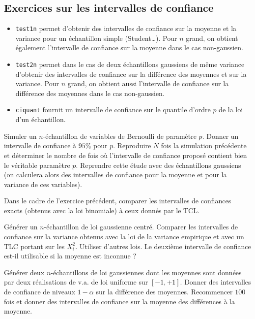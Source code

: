 \subsection{Exercices sur les intervalles de confiance}

\begin{itemize}
\item \texttt{test1n} permet d'obtenir des intervalles de confiance sur la
  moyenne et la variance pour un échantillon simple (Student\ldots). Pour $n$
  grand, on obtient également l'intervalle de confiance sur la moyenne dans le
  cas non-gaussien.
\item \texttt{test2n} permet dans le cas de deux échantillons gaussiens de
  même variance d'obtenir des intervalles de confiance sur la différence des
  moyennes et sur la variance. Pour $n$ grand, on obtient aussi l'intervalle
  de confiance sur la différence des moyennes dans le cas non-gaussien.
\item \texttt{ciquant} fournit un intervalle de confiance sur le quantile
  d'ordre $p$ de la loi d'un échantillon.
\end{itemize}

\begin{exo}
  Simuler un $n$-échantillon de variables de Bernoulli de paramètre $p$.
  Donner un intervalle de confiance à $95\%$ pour $p$. Reproduire $N$ fois la
  simulation précédente et déterminer le nombre de fois où l'intervalle de
  confiance proposé contient bien le véritable paramètre $p$. Reprendre cette
  étude avec des échantillons gaussiens (on calculera alors des intervalles de
  confiance pour la moyenne et pour la variance de ces variables).
\end{exo}

\begin{exo}
  Dans le cadre de l'exercice précédent, comparer les intervalles de
  confiances exacts (obtenus avec la loi binomiale) à ceux donnés par le TCL.
\end{exo}

\begin{exo}
  Générer un $n$-échantillon de loi gaussienne centré. Comparer les
  intervalles de confiance sur la variance obtenus avec la loi de la variance
  empirique et avec un TLC portant sur les $X_i^2$. Utiliser d'autres lois. Le
  deuxième intervalle de confiance est-il utilisable si la moyenne est
  inconnue ?
\end{exo}

\begin{exo}
  Générer deux $n$-échantillons de loi gaussiennes dont les moyennes sont
  données par deux réalisations de v.a. de loi uniforme sur $[-1,+1]$. Donner
  des intervalles de confiance de niveaux $1-\alpha$ sur la différence des
  moyennes. Recommencer $100$ fois et donner des intervalles de confiance sur
  la moyenne des différences à la moyenne.
\end{exo}


